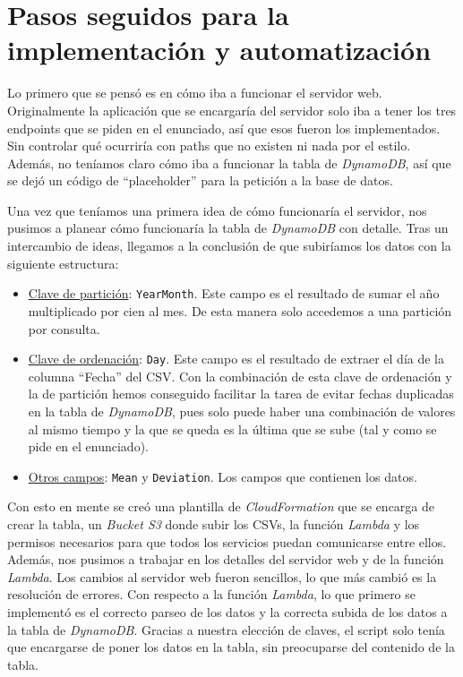 \section{Pasos seguidos para la implementación y automatización}

Lo primero que se pensó es en cómo iba a funcionar el servidor web. Originalmente la aplicación que se encargaría del servidor solo iba a tener los tres endpoints que se piden en el enunciado, así que esos fueron los implementados. Sin controlar qué ocurriría con paths que no existen ni nada por el estilo. Además, no teníamos claro cómo iba a funcionar la tabla de \textit{DynamoDB}, así que se dejó un código de ``placeholder'' para la petición a la base de datos.

Una vez que teníamos una primera idea de cómo funcionaría el servidor, nos pusimos a planear cómo funcionaría la tabla de \textit{DynamoDB} con detalle. Tras un intercambio de ideas, llegamos a la conclusión de que subiríamos los datos con la siguiente estructura:

\begin{itemize}
    \item \underline{Clave de partición}: \texttt{YearMonth}. Este campo es el resultado de sumar el año multiplicado por cien al mes. De esta manera solo accedemos a una partición por consulta.
    \item \underline{Clave de ordenación}: \texttt{Day}. Este campo es el resultado de extraer el día de la columna ``Fecha'' del CSV. Con la combinación de esta clave de ordenación y la de partición hemos conseguido facilitar la tarea de evitar fechas duplicadas en la tabla de \textit{DynamoDB}, pues solo puede haber una combinación de valores al mismo tiempo y la que se queda es la última que se sube (tal y como se pide en el enunciado).
    \item \underline{Otros campos}: \texttt{Mean} y \texttt{Deviation}. Los campos que contienen los datos.
\end{itemize}

Con esto en mente se creó una plantilla de \textit{CloudFormation} que se encarga de crear la tabla, un \textit{Bucket S3} donde subir los CSVs, la función \textit{Lambda} y los permisos necesarios para que todos los servicios puedan comunicarse entre ellos. Además, nos pusimos a trabajar en los detalles del servidor web y de la función \textit{Lambda}. Los cambios al servidor web fueron sencillos, lo que más cambió es la resolución de errores. Con respecto a la función \textit{Lambda}, lo que primero se implementó es el correcto parseo de los datos y la correcta subida de los datos a la tabla de \textit{DynamoDB}. Gracias a nuestra elección de claves, el script solo tenía que encargarse de poner los datos en la tabla, sin preocuparse del contenido de la tabla.

